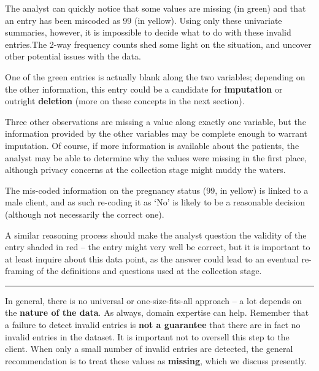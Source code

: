 The analyst can quickly notice that some values are missing (in green) and that an entry has been miscoded as 99 (in yellow). Using only these univariate summaries, however, it is impossible to decide what to do with these invalid entries.\newl The 2-way frequency counts shed some light on the situation, and uncover other potential issues with the data. \par One of the green entries is actually blank along the two variables; depending on the other information, this entry could be a candidate for \textbf{imputation} or outright \textbf{deletion} (more on these concepts in the next section). \par Three other observations are missing a value along exactly one variable, but the information provided by the other variables may be complete enough to warrant imputation. Of course, if more information is available about the patients, the analyst may be able to determine why the values were missing in the first place, although privacy concerns at the collection stage might muddy the waters. \par The mis-coded information on the pregnancy status (99, in yellow) is linked to a male client, and as such re-coding it as `No' is likely to be a reasonable decision (although not necessarily the correct one).\par  A similar reasoning process should make the analyst question the validity of the entry shaded in red -- the entry might very well be correct, but it is important to at least inquire about this data point, as the answer could lead to an eventual re-framing of the definitions and questions used at the collection stage.   
\begin{center}
    \rule{0.5\linewidth}{.4pt}
\end{center}
In general, there is no universal or one-size-fits-all approach -- a lot depends on the \textbf{nature of the data}. As always, domain expertise can help. \newl Remember that a failure to detect invalid entries is \textbf{not a guarantee} that there are in fact no invalid entries in the dataset. It is important not to oversell this step to the client. When only a small number of invalid entries are detected, the general recommendation is to treat these values as  \textbf{missing}, which we discuss presently.
